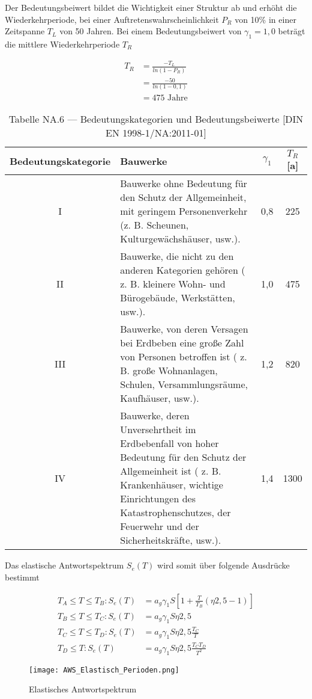 Der Bedeutungsbeiwert bildet die Wichtigkeit einer Struktur ab und erhöht die Wiederkehrperiode, bei einer Auftretenswahrscheinlichkeit $P_R$ von 10\% in einer Zeitspanne $T_L$ von 50 Jahren.
Bei einem Bedeutungsbeiwert von $\gamma_1 = 1,0$ beträgt die mittlere Wiederkehrperiode $T_R$

\begin{align*}
T_R &= \frac{-T_L}{ln(1 - P_R)}\\
    &= \frac{-50}{ln(1 - 0,1)}\\
    &=  475 \mbox{ Jahre}
\end{align*}

\begin{table}[H]
\centering
\begin{tabular}{ |c|p{7cm}|c|c| } 
 \hline
 Bedeutungskategorie & Bauwerke & $\gamma_1$ & $T_R$ [a]\\
 \hline\hline
 I   & Bauwerke ohne Bedeutung für den Schutz der Allgemeinheit, mit geringem Personenverkehr (z. B. Scheunen, Kulturgewächshäuser, usw.). & 0,8 & 225\\
 \hline
 II  & Bauwerke, die nicht zu den anderen Kategorien gehören ( z. B. kleinere Wohn- und Bürogebäude, Werkstätten, usw.). & 1,0 & 475\\
 \hline
 III & Bauwerke, von deren Versagen bei Erdbeben eine große Zahl von Personen betroffen ist ( z. B. große Wohnanlagen, Schulen, Versammlungsräume, Kaufhäuser, usw.). & 1,2 & 820\\
 \hline
 IV  & Bauwerke, deren Unversehrtheit im Erdbebenfall von hoher Bedeutung für den Schutz der Allgemeinheit ist ( z. B. Krankenhäuser, wichtige Einrichtungen des Katastrophenschutzes, der Feuerwehr und der Sicherheitskräfte, usw.). & 1,4 & 1300\\
 \hline
\end{tabular}
\caption{Tabelle NA.6 — Bedeutungskategorien und Bedeutungsbeiwerte [DIN EN 1998-1/NA:2011-01]}
\end{table}

Das elastische Antwortspektrum $S_e(T)$ wird somit über folgende Ausdrücke bestimmt

\begin{align*}
T_A \leq T \leq T_B: S_e(T) &= a_g\gamma_1S \left[ 1+\frac{T}{T_B}(\eta2,5-1) \right] \\
T_B \leq T \leq T_C: S_e(T) &= a_g\gamma_1S\eta2,5\\
T_C \leq T \leq T_D: S_e(T) &= a_g\gamma_1S\eta2,5\frac{T_C}{T}\\
T_D \leq T: S_e(T) &= a_g\gamma_1S\eta2,5\frac{T_CT_D}{T^2}
\end{align*}

\begin{figure}[H]
    \centering
    \texttt{[image: AWS\_Elastisch\_Perioden.png]}
    \caption{Elastisches Antwortspektrum}
\end{figure}

\pagebreak
